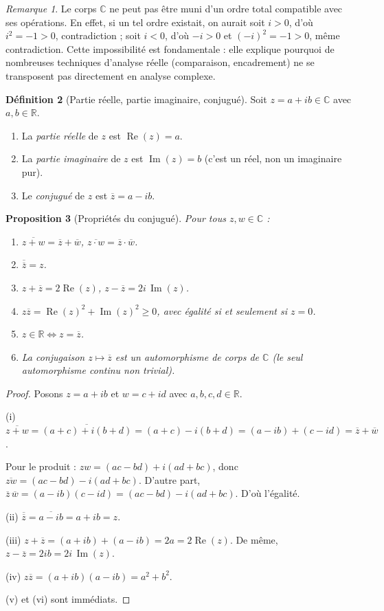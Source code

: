 \documentclass[12pt,a4paper,openany]{book}
\theoremstyle{definition}
\newtheorem{definition}{Définition}[chapter]
\theoremstyle{plain}
\newtheorem{proposition}[definition]{Proposition}
\theoremstyle{remark}
\newtheorem{remarque}[definition]{Remarque}
\newcommand{\C}{\mathbb{C}}
\newcommand{\R}{\mathbb{R}}
\DeclareMathOperator{\re}{Re}
\DeclareMathOperator{\im}{Im}
\newcommand{\conj}[1]{\overline{#1}}
\begin{document}
\begin{remarque}\label{rem:C-non-ordonne}
Le corps $\C$ ne peut pas être muni d'un ordre total compatible avec ses opérations. En effet, si un tel ordre existait, on aurait soit $i > 0$, d'où $i^2 = -1 > 0$, contradiction ; soit $i < 0$, d'où $-i > 0$ et $(-i)^2 = -1 > 0$, même contradiction. Cette impossibilité est fondamentale : elle explique pourquoi de nombreuses techniques d'analyse réelle (comparaison, encadrement) ne se transposent pas directement en analyse complexe.
\end{remarque}

\begin{definition}[Partie réelle, partie imaginaire, conjugué]\label{def:re-im-conj}
Soit $z = a + ib \in \C$ avec $a, b \in \R$.
\begin{enumerate}[label=(\roman*)]
  \item La \emph{partie réelle} de $z$ est $\re(z) = a$.
  \item La \emph{partie imaginaire} de $z$ est $\im(z) = b$ (c'est un réel, non un imaginaire pur).
  \item Le \emph{conjugué} de $z$ est $\conj{z} = a - ib$.
\end{enumerate}
\end{definition}

\begin{proposition}[Propriétés du conjugué]\label{prop:proprietes-conjugue}
Pour tous $z, w \in \C$ :
\begin{enumerate}[label=(\roman*)]
  \item $\conj{z + w} = \conj{z} + \conj{w}$, \quad $\conj{z \cdot w} = \conj{z} \cdot \conj{w}$.
  \item $\conj{\conj{z}} = z$.
  \item $z + \conj{z} = 2\re(z)$, \quad $z - \conj{z} = 2i\,\im(z)$.
  \item $z \conj{z} = \re(z)^2 + \im(z)^2 \geq 0$, avec égalité si et seulement si $z = 0$.
  \item $z \in \R \iff z = \conj{z}$.
  \item La conjugaison $z \mapsto \conj{z}$ est un automorphisme de corps de $\C$ (le seul automorphisme continu non trivial).
\end{enumerate}
\end{proposition}

\begin{proof}
Posons $z = a + ib$ et $w = c + id$ avec $a,b,c,d \in \R$.

(i) $\conj{z+w} = \conj{(a+c) + i(b+d)} = (a+c) - i(b+d) = (a-ib) + (c-id) = \conj{z} + \conj{w}$.

Pour le produit : $zw = (ac-bd) + i(ad+bc)$, donc $\conj{zw} = (ac-bd) - i(ad+bc)$. D'autre part, $\conj{z}\,\conj{w} = (a-ib)(c-id) = (ac-bd) - i(ad+bc)$. D'où l'égalité.

(ii) $\conj{\conj{z}} = \conj{a-ib} = a + ib = z$.

(iii) $z + \conj{z} = (a+ib) + (a-ib) = 2a = 2\re(z)$. De même, $z - \conj{z} = 2ib = 2i\,\im(z)$.

(iv) $z\conj{z} = (a+ib)(a-ib) = a^2 + b^2$.

(v) et (vi) sont immédiats.
\end{proof}
\end{document}

